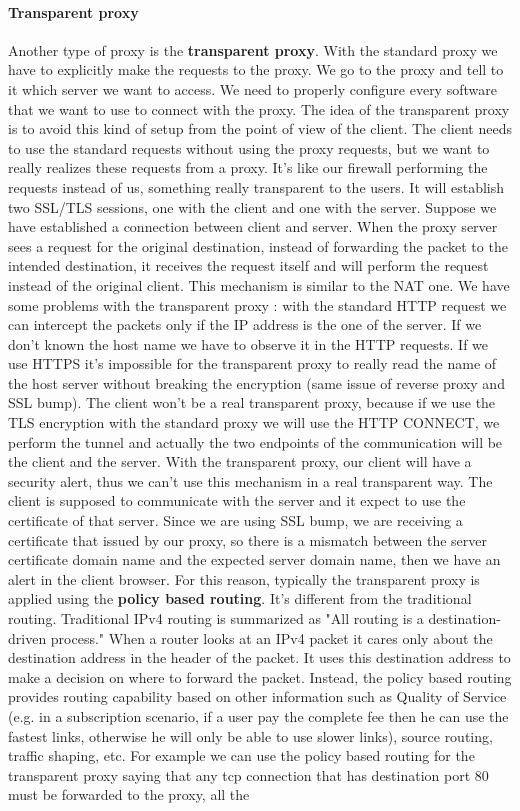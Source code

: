 \documentclass[11pt]{article}
\begin{document}
\paragraph{Transparent proxy} Another type of proxy is the \textbf{transparent proxy}. With the standard proxy we have to explicitly make the requests to the proxy. We go to the proxy and tell to it which server we want to access. We need to properly configure every software that we want to use to connect with the proxy. The idea of the transparent proxy is to avoid this kind of setup from the point of view of the client. The client needs to use the standard requests without using the proxy requests, but we want to really realizes these requests from a proxy. It's like our firewall performing the requests instead of us, something really transparent to the users. It will establish two SSL/TLS sessions, one with the client and one with the server. Suppose we have established a connection between client and server. When the proxy server sees a request for the original destination, instead of forwarding the packet to the intended destination, it receives the request itself and will perform the request instead of the original client. This mechanism is similar to the NAT one. We have some problems with the transparent proxy : with the standard HTTP request we can intercept the packets only if the IP address is the one of the server. If we don't known the host name we have to observe it in the HTTP requests. If we use HTTPS it's impossible for the transparent proxy to really read the name of the host server without breaking the encryption (same issue of reverse proxy and SSL bump). The client won't be a real transparent proxy, because if we use the TLS encryption with the standard proxy we will use the HTTP CONNECT, we perform the tunnel and actually the two endpoints of the communication will be the client and the server. With the transparent proxy, our client will have a security alert, thus we can't use this mechanism in a real transparent way. The client is supposed to communicate with the server and it expect to use the certificate of that server. Since we are using SSL bump, we are receiving a certificate that issued by our proxy, so there is a mismatch between the server certificate domain name and the expected server domain name, then we have an alert in the client browser. For this reason, typically the transparent proxy is applied using the \textbf{policy based routing}. It's different from the traditional routing. Traditional IPv4 routing is summarized as "All routing is a destination-driven process." When a router looks at an IPv4 packet it cares only about the destination address in the header of the packet. It uses this destination address to make a decision on where to forward the packet. Instead, the policy based routing provides routing capability based on other information such as Quality of Service (e.g. in a subscription scenario, if a user pay the complete fee then he can use the fastest links, otherwise he will only be able to use slower links), source routing, traffic shaping, etc. For example we can use the policy based routing for the transparent proxy saying that any tcp connection that has destination port 80 must be forwarded to the proxy, all the 
\end{document}
